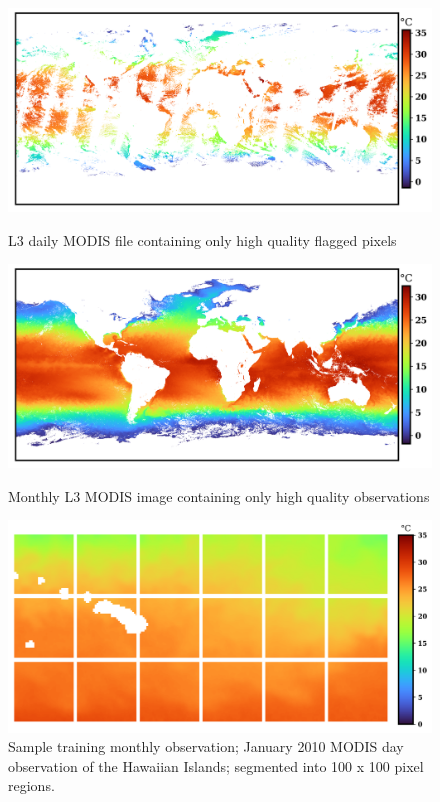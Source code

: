 \begin{figure}[!ht]
	\centering
    \caption{L3 daily MODIS file containing only high quality flagged pixels}
	\includegraphics[width=1.0\linewidth]{m2/ims/fig2_5.png}
    \label{fig2_5}
\end{figure}

\begin{figure}[!ht]
	\centering
    \caption{Monthly L3 MODIS image containing only high quality observations}
	\includegraphics[width=1.0\linewidth]{m2/ims/fig2_6.png}
    \label{fig2_6}
\end{figure}

\begin{figure}[!ht]
	\centering
    \caption{Sample training monthly observation; January 2010 MODIS day observation of the Hawaiian Islands; segmented into 100 x 100 pixel regions.}
	\includegraphics[width=1.0\linewidth]{m2/ims/fig2_7.png}
    
    \label{fig2_7}
\end{figure}

